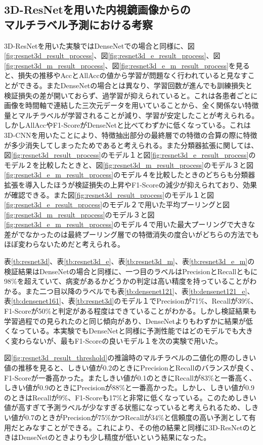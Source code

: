 \subsection{3D-ResNetを用いた内視鏡画像からの\\マルチラベル予測における考察}
3D-ResNetを用いた実験ではDenseNetでの場合と同様に、図\ref{fig:resnet3d_result_process}、図\ref{fig:resnet3d_e_result_process}、図\ref{fig:resnet3d_m_result_process}、図\ref{fig:resnet3d_e_m_result_process}を見ると、損失の推移やAccとAllAccの値から学習が問題なく行われていると見なすことができる。またDenseNetの場合とは異なり、学習回数が進んでも訓練損失と検証損失の差が開いておらず、過学習が抑えられていると。これは各患者ごとに画像を時間軸で連結した三次元データを用いていることから、全く関係ない特徴量とマルチラベルが学習されることが減り、学習が安定したことが考えられる。しかしAllAccやF1-ScoreがDenseNetと比べてわずかに低くなっている。これは3D-CNNを用いたことにより、特徴抽出部分の最終層での特徴の合算の際に特徴が多少消失してしまったためであると考えられる。また分類器拡張に関しては、図\ref{fig:resnet3d_result_process}のモデル１と図\ref{fig:resnet3d_e_result_process}のモデル２を比較したときと、図\ref{fig:resnet3d_m_result_process}のモデル３と図\ref{fig:resnet3d_e_m_result_process}のモデル４を比較したときのどちらも分類器拡張を導入したほうが検証損失の上昇やF1-Scoreの減少が抑えられており、効果が確認できる。また図\ref{fig:resnet3d_result_process}のモデル１と図\ref{fig:resnet3d_e_result_process}のモデル２で用いた平均プーリングと図\ref{fig:resnet3d_m_result_process}のモデル３と図\ref{fig:resnet3d_e_m_result_process}のモデル４で用いた最大プーリングで大きな差がでなかったのは最終プーリング層での特徴消失の度合いがどちらの方法でもほぼ変わらないためだと考えられる。

表\ref{tb:resnet3d}、表\ref{tb:resnet3d_e}、表\ref{tb:resnet3d_m}、表\ref{tb:resnet3d_e_m}の検証結果はDenseNetの場合と同様に、一つ目のラベルはPrecisionとRecallともに98\%を超えていて、病変があるかどうかの判定は高い精度を持っていることがわかる。また二つ目以降のラベルでも表\ref{tb:densenet121}、表\ref{tb:densenet121_e}、表\ref{tb:densenet161}、表\ref{tb:resnet3d}のモデル１でPrecisionが71\%、Recallが39\%、F1-Scoreが50\%と判定がある程度はできていることがわかる。しかし検証結果も学習過程での見られたのと同じ傾向があり、DenseNetよりもわずかに結果が低くなっている。本実験でもDenseNetと同様に予測性能ではどのモデルでも大きく変わらないが、最もF1-Scoreの良いモデル１を次の実験で用いた。

図\ref{fig:resnet3d_result_threshold}の推論時のマルチラベルの二値化の際のしきい値の推移を見ると、しきい値が0.2のときにPrecisionとRecallのバランスが良く、F1-Scoreが一番高かった。またしきい値が0.1のときにRecallが83\%と一番高く、しきい値が0.9のときにPrecisionが88\%と一番高かった。しかし、しきい値が0.9のときはRecallが9\%、F1-Scoreも17\%と非常に低くなっている。このためしきい値が高すぎて予測ラベルが少なすぎる状態になっていると考えられるため、しきい値が0.7のときがPrecisionが75\%かつRecallが34\%と信頼度の高い予測として有用だとみなすことができる。これにより、その他の結果と同様に3D-ResNetのときはDenseNetのときよりも少し精度が低いという結果になった。

